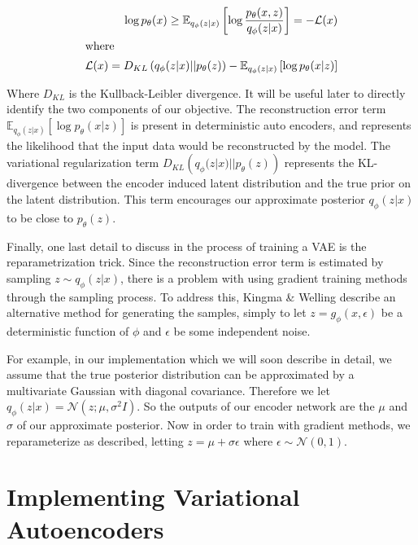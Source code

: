 \documentclass{article} %
\numberwithin{figure}{section}
\renewcommand{\L}{\mathcal{L}}
\begin{document}
\begin{align}
\log p_\theta(x)\geq \mathbb{E}_{q_\phi(z|x)}\left[\log\frac{p_\theta(x,z)}{q_\phi(z|x)}\right]=-\L(x)\\
\intertext{where}
  \L(x)=D_{KL}\left(q_\phi(z|x)||p_\theta(z)\right)-\mathbb{E}_{q_\phi(z|x)}\left[\log{p_\theta(x|z)}\right]
  \label{eq:VAEOBJECTIVE}
\end{align}
 
 Where $D_{KL}$ is the Kullback-Leibler divergence. It will be useful later to directly identify the two components of our objective. The reconstruction error term $\mathbb{E}_{q_\phi(z|x)}\left[\log{p_\theta(x|z)}\right]$ is present in deterministic auto encoders, and represents the likelihood that the input data would be reconstructed by the model. The variational regularization term $D_{KL}\left(q_\phi(z|x)||p_\theta(z)\right)$ represents the KL-divergence between the encoder induced latent distribution and the true prior on the latent distribution. This term encourages our approximate posterior $q_\phi(z|x)$ to be close to $p_\theta(z)$.
\par Finally, one last detail to discuss in the process of training a VAE is the reparametrization trick. Since the reconstruction error term is estimated by sampling $z\sim q_\phi(z|x)$, there is a problem with using gradient training methods through the sampling process. To address this, Kingma \& Welling describe an alternative method for generating the samples, simply to let $z=g_\phi(x,\epsilon)$ be a deterministic function of $\phi$ and $\epsilon$ be some independent noise.
\par For example, in our implementation which we will soon describe in detail, we assume that the true posterior distribution can be approximated by a multivariate Gaussian with diagonal covariance. Therefore we let $q_\phi(z|x)=\mathcal{N}(z;\mu,\sigma^2 I)$. So the outputs of our encoder network are the $\mu$ and $\sigma$ of our approximate posterior. Now in order to train with gradient methods, we reparameterize as described, letting $z=\mu + \sigma\epsilon$ where $\epsilon \sim \mathcal{N}(0,1)$.

\section{Implementing Variational Autoencoders}
\end{document}
